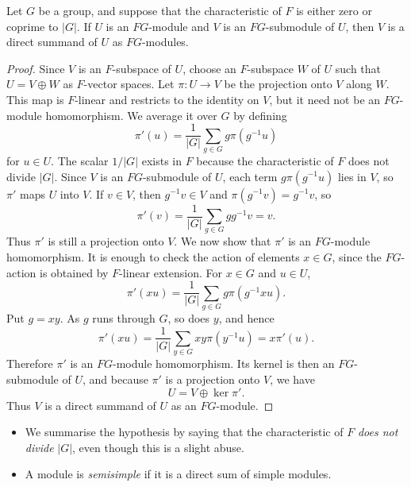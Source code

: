 \documentclass[../Odyssey_Project.tex]{subfiles}
\begin{document}
\begin{namedtheorem}
\label{thm:maschke}
Let $G$ be a group, and suppose that the characteristic of $F$ is either zero or coprime to $|G|$. If $U$ is an $FG$-module and $V$ is an $FG$-submodule of $U$, then $V$ is a direct summand of $U$ as $FG$-modules.
\end{namedtheorem}
\begin{proof}
    Since $V$ is an $F$-subspace of $U$, choose an $F$-subspace $W$ of $U$ such that $U = V \oplus W$ as $F$-vector spaces. Let $\pi \colon U \to V$ be the projection onto $V$ along $W$. This map is $F$-linear and restricts to the identity on $V$, but it need not be an $FG$-module homomorphism. We average it over $G$ by defining
    \[
        \pi'(u) = \frac{1}{|G|}\sum_{g \in G} g\pi(g^{-1}u)
    \]
    for $u \in U$. The scalar $1/|G|$ exists in $F$ because the characteristic of $F$ does not divide $|G|$. Since $V$ is an $FG$-submodule of $U$, each term $g\pi(g^{-1}u)$ lies in $V$, so $\pi'$ maps $U$ into $V$. If $v \in V$, then $g^{-1}v \in V$ and $\pi(g^{-1}v) = g^{-1}v$, so
    \[
        \pi'(v) = \frac{1}{|G|}\sum_{g \in G} gg^{-1}v = v.
    \]
    Thus $\pi'$ is still a projection onto $V$. We now show that $\pi'$ is an $FG$-module homomorphism. It is enough to check the action of elements $x \in G$, since the $FG$-action is obtained by $F$-linear extension. For $x \in G$ and $u \in U$,
    \[
        \pi'(xu)
        = \frac{1}{|G|}\sum_{g \in G} g\pi(g^{-1}xu).
    \]
    Put $g = xy$. As $g$ runs through $G$, so does $y$, and hence
    \[
        \pi'(xu)
        = \frac{1}{|G|}\sum_{y \in G} xy\pi(y^{-1}u)
        = x\pi'(u).
    \]
    Therefore $\pi'$ is an $FG$-module homomorphism. Its kernel is then an $FG$-submodule of $U$, and because $\pi'$ is a projection onto $V$, we have
    \[
        U = V \oplus \ker \pi'.
    \]
    Thus $V$ is a direct summand of $U$ as an $FG$-module.
\end{proof}

\begin{itemize}
    \item We summarise the hypothesis by saying that the characteristic of $F$ \emph{does not divide} $|G|$, even though this is a slight abuse.
    \item A module is \emph{semisimple} if it is a direct sum of simple modules.
\end{itemize}
\end{document}
